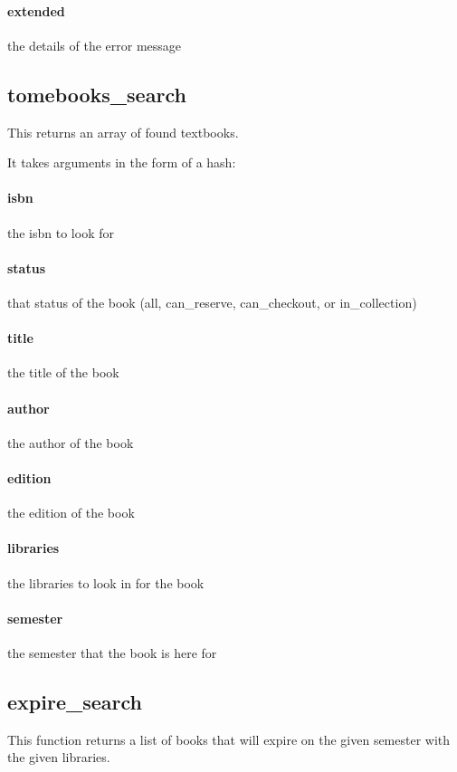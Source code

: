 \documentclass[12pt,titlepage]{article}
\begin{document}
\paragraph{extended}
the details of the error message

\subsection{tomebooks_search}
This returns an array of found textbooks.

It takes arguments in the form of a hash:
\paragraph{isbn}
the isbn to look for 

\paragraph{status}
that status of the book (all, can_reserve, can_checkout, or in_collection) 

\paragraph{title}
the title of the book 

\paragraph{author}
the author of the book 

\paragraph{edition}
the edition of the book 

\paragraph{libraries}
the libraries to look in for the book

\paragraph{semester}
the semester that the book is here for

\subsection{expire_search}
This function returns a list of books that will expire on the given semester with the given libraries.
\end{document}
